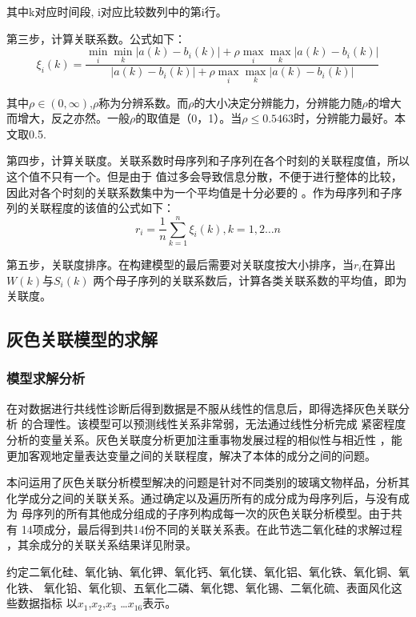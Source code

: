 \documentclass[UTF8]{ctexart}
\begin{document}
其中k对应时间段, i对应比较数列中的第i行。

第三步，计算关联系数。公式如下：
\begin{equation}
    \xi_{i}(k)=\frac{\min _{i} \min _{k}\left|a(k)-b_{i}(k)\right|+\rho \max _{i} \max _{k}\left|a(k)-b_{i}(k)\right|}{\left|a(k)-b_{i}(k)\right|+\rho \max _{i} \max _{k}\left|a(k)-b_{i}(k)\right|}
\end{equation}

其中$\rho \in(0, \infty)$,$\rho$称为分辨系数。而$\rho$的大小决定分辨能力，分辨能力随$\rho$的增大
而增大，反之亦然。一般$\rho$的取值是（0，1）。当$\rho\mathbf{\le }0.5463$时，分辨能力最好。本文取0.5.

第四步，计算关联度。关联系数时母序列和子序列在各个时刻的关联程度值，所以这个值不只有一个。但是由于
值过多会导致信息分散，不便于进行整体的比较，因此对各个时刻的关联系数集中为一个平均值是十分必要的
。作为母序列和子序列的关联程度的该值的公式如下：
\begin{equation}
    r_{i}=\frac{1}{n} \sum_{k=1}^{n} \xi_{i}(k), k=1,2 \ldots n
\end{equation}

第五步，关联度排序。在构建模型的最后需要对关联度按大小排序，当$r_{i}$在算出$W(k)$与$S_{i}(k)$
两个母子序列的关联系数后，计算各类关联系数的平均值，即为关联度。

\subsection{灰色关联模型的求解}
\subsubsection{模型求解分析}
在对数据进行共线性诊断后得到数据是不服从线性的信息后，即得选择灰色关联分析
的合理性。该模型可以预测线性关系非常弱，无法通过线性分析完成
紧密程度分析的变量关系。灰色关联度分析更加注重事物发展过程的相似性与相近性
，能更加客观地定量表达变量之间的关联程度，解决了本体的成分之间的问题。

本问运用了灰色关联分析模型解决的问题是针对不同类别的玻璃文物样品，分析其
化学成分之间的关联关系。通过确定以及遍历所有的成分成为母序列后，与没有成为
母序列的所有其他成分组成的子序列构成每一次的灰色关联分析模型。由于共有
14项成分，最后得到共14份不同的关联关系表。在此节选二氧化硅的求解过程
，其余成分的关联关系结果详见附录。

约定二氧化硅、氧化钠、氧化钾、氧化钙、氧化镁、氧化铝、氧化铁、氧化铜、氧化铁、
氧化铅、氧化钡、五氧化二磷、氧化锶、氧化锡、二氧化硫、表面风化这些数据指标
以$x_1$,$x_2$,$x_3$ \dots $x_{16}$表示。
\end{document}
